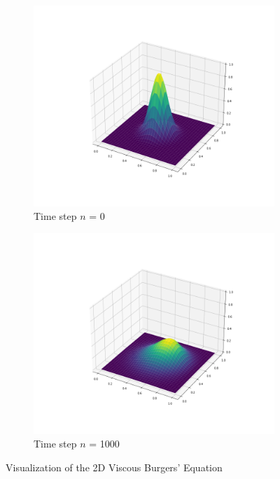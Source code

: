 \documentclass{article}
\begin{document}
\begin{figure}[h]
\begin{subfigure}{.5\textwidth}
  \centering
  \includegraphics[width=1.0\linewidth]{Images/2D_Viscous_Burgers_Graph_0.png}
  \caption{Time step $n$ = 0}
  \label{fig:sfig1}
\end{subfigure}%
\begin{subfigure}{.5\textwidth}
  \centering
  \includegraphics[width=1.0\linewidth]{Images/2D_Viscous_Burgers_Graph_999.png}
  \caption{Time step $n$ = 1000}
  \label{fig:sfig2}
\end{subfigure}
\caption{Visualization of the 2D Viscous Burgers' Equation}
\label{2D_Vis_Burg_Vis}
\end{figure}
\end{document}

